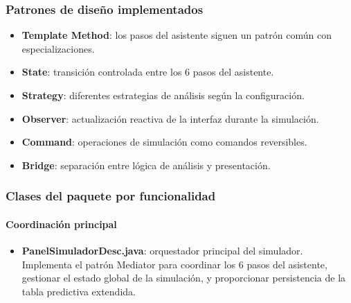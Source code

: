 \subsubsection{Patrones de diseño implementados}

\begin{itemize}
    \item \textbf{Template Method}: los pasos del asistente siguen un patrón común con especializaciones.
    \item \textbf{State}: transición controlada entre los 6 pasos del asistente.
    \item \textbf{Strategy}: diferentes estrategias de análisis según la configuración.
    \item \textbf{Observer}: actualización reactiva de la interfaz durante la simulación.
    \item \textbf{Command}: operaciones de simulación como comandos reversibles.
    \item \textbf{Bridge}: separación entre lógica de análisis y presentación.
\end{itemize}

\subsubsection{Clases del paquete por funcionalidad}

\paragraph{Coordinación principal}
\begin{itemize}
    \item \textbf{PanelSimuladorDesc.java}: orquestador principal del simulador. Implementa el patrón Mediator para coordinar los 6 pasos del asistente, gestionar el estado global de la simulación, y proporcionar persistencia de la tabla predictiva extendida.
\end{itemize}

